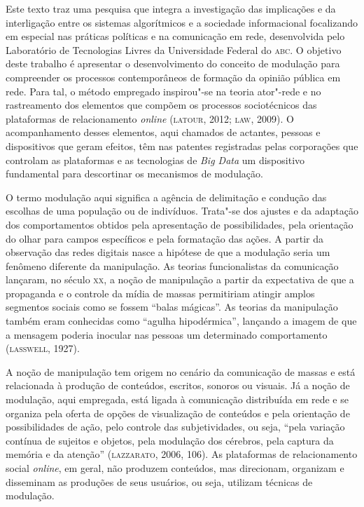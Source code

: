\begin{flushright}
\end{flushright}

\noindent{}Este texto traz uma pesquisa que integra a investigação das implicações
e da interligação entre os sistemas algorítmicos e a sociedade
informacional focalizando em especial nas práticas políticas e na
comunicação em rede, desenvolvida pelo Laboratório de Tecnologias Livres
da Universidade Federal do \textsc{abc}. O objetivo deste trabalho é apresentar o
desenvolvimento do conceito de modulação para compreender os processos
contemporâneos de formação da opinião pública em rede. Para tal, o
método empregado inspirou"-se na teoria ator"-rede e no rastreamento dos
elementos que compõem os processos sociotécnicos das plataformas de
relacionamento \textit{online} (\textsc{latour}, 2012; \textsc{law}, 2009). O acompanhamento
desses elementos, aqui chamados de actantes, pessoas e dispositivos que
geram efeitos, têm nas patentes registradas pelas corporações que
controlam as plataformas e as tecnologias de \textit{Big Data} um dispositivo
fundamental para descortinar os mecanismos de modulação.

O termo modulação aqui significa a agência de delimitação e condução das
escolhas de uma população ou de indivíduos. Trata"-se dos ajustes e da
adaptação dos comportamentos obtidos pela apresentação de
possibilidades, pela orientação do olhar para campos específicos e pela
formatação das ações. A partir da observação das redes digitais nasce a
hipótese de que a modulação seria um fenômeno diferente da manipulação.
As teorias funcionalistas da comunicação lançaram, no século \textsc{xx}, a noção
de manipulação a partir da expectativa de que a propaganda e o controle
da mídia de massas permitiriam atingir amplos segmentos sociais como se
fossem ``balas mágicas''. As teorias da manipulação também eram
conhecidas como ``agulha hipodérmica'', lançando a imagem de que a
mensagem poderia inocular nas pessoas um determinado comportamento
(\textsc{lasswell}, 1927).

A noção de manipulação tem origem no cenário da comunicação de massas e
está relacionada à produção de conteúdos, escritos, sonoros ou visuais.
Já a noção de modulação, aqui empregada, está ligada à comunicação
distribuída em rede e se organiza pela oferta de opções de visualização
de conteúdos e pela orientação de possibilidades de ação, pelo controle
das subjetividades, ou seja, ``pela variação contínua de sujeitos e
objetos, pela modulação dos cérebros, pela captura da memória e da
atenção'' (\textsc{lazzarato}, 2006, 106). As plataformas de relacionamento
social \textit{online}, em geral, não produzem conteúdos, mas direcionam,
organizam e disseminam as produções de seus usuários, ou seja, utilizam
técnicas de modulação.

